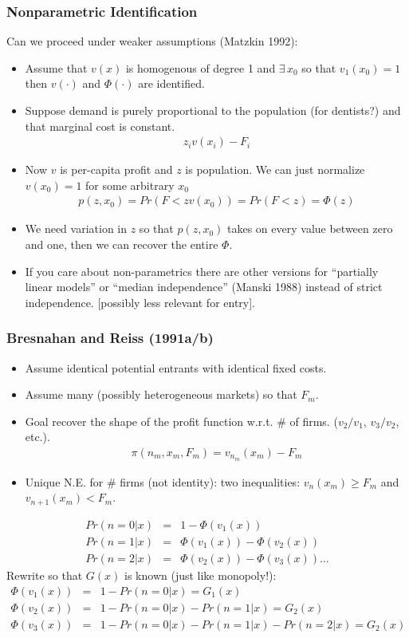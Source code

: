 \begin{frame}
\frametitle{Nonparametric Identification}
\small
Can we proceed under weaker assumptions (Matzkin 1992):
\begin{itemize}
\item Assume that $v(x)$ is homogenous of degree 1 and $\exists\, x_0$ so that $v_1(x_0) =1$ then $v(\cdot)$ and $\Phi(\cdot)$ are identified.
\item Suppose demand is purely proportional to the population (for dentists?) and that marginal cost is constant.
\begin{eqnarray*}
z_i v(x_i) - F_i
\end{eqnarray*}
\item Now $v$ is per-capita profit and $z$ is population. We can just normalize $v(x_0)=1$ for some arbitrary $x_0$
\begin{eqnarray*}
p(z,x_0) = Pr(F < z v(x_0)) = Pr( F < z) = \Phi(z)
\end{eqnarray*}
\item We need variation in $z$ so that $p(z,x_0)$ takes on every value between zero and one, then we can recover the entire $\Phi$.
\item If you care about non-parametrics there are other versions for ``partially linear models'' or ``median independence'' (Manski 1988) instead of strict independence. [possibly less relevant for entry].
\end{itemize}
\end{frame}


\begin{frame}
\frametitle{Bresnahan and Reiss (1991a/b)}
\small
\begin{itemize}
\item Assume identical potential entrants with identical fixed costs.
\item Assume many (possibly heterogeneous markets) so that $F_m$.
\item Goal recover the shape of the profit function w.r.t. \# of firms. ($v_2/v_1$, $v_3/v_2$, etc.).
\begin{eqnarray*}
\pi(n_m, x_m, F_m) = v_{n_m} (x_m) - F_m
\end{eqnarray*}
\item Unique N.E. for \# firms (not identity): two inequalities: $v_{n}(x_m) \geq F_m$ and $v_{n+1}(x_m) < F_m$.
\end{itemize}
\begin{eqnarray*}
Pr(n=0 | x) &=& 1- \Phi(v_1(x))\\
Pr(n=1 | x) &=& \Phi(v_1(x))-\Phi(v_2(x))  \\
Pr(n=2 | x) &=& \Phi(v_2(x))-\Phi(v_3(x))  \ldots
\end{eqnarray*}
Rewrite so that $G(x)$ is known (just like monopoly!):
\begin{eqnarray*}
 \Phi(v_1(x)) &=& 1- Pr(n=0 | x) = G_1(x)\\
 \Phi(v_2(x)) &=& 1- Pr(n=0 | x)  - Pr(n=1 | x) = G_2(x)\\
 \Phi(v_3(x)) &=& 1- Pr(n=0 | x)  - Pr(n=1 | x) - Pr(n=2 | x) = G_2(x)\\
\end{eqnarray*}
\end{frame}

